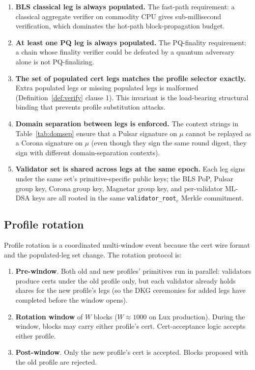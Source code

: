 \begin{enumerate}[leftmargin=2em,nosep]
\item \textbf{BLS classical leg is always populated.} The fast-path
      requirement: a classical aggregate verifier on commodity CPU
      gives sub-millisecond verification, which dominates the
      hot-path block-propagation budget.
\item \textbf{At least one PQ leg is always populated.} The PQ-finality
      requirement: a chain whose finality verifier could be defeated
      by a quantum adversary alone is not PQ-finalizing.
\item \textbf{The set of populated cert legs matches the profile
      selector exactly.} Extra populated legs or missing populated
      legs is malformed (Definition~\ref{def:verify} clause 1).
      This invariant is the load-bearing structural binding that
      prevents profile substitution attacks.
\item \textbf{Domain separation between legs is enforced.} The
      context strings in Table~\ref{tab:domsep} ensure that a Pulsar
      signature on $\mu$ cannot be replayed as a Corona signature on
      $\mu$ (even though they sign the same round digest, they sign
      with different domain-separation contexts).
\item \textbf{Validator set is shared across legs at the same epoch.}
      Each leg signs under the same set's primitive-specific public
      keys; the BLS PoP, Pulsar group key, Corona group key, Magnetar
      group key, and per-validator ML-DSA keys are all rooted in the
      same \texttt{validator\_root}$_e$ Merkle commitment.
\end{enumerate}

\subsection{Profile rotation}
\label{sec:profile-rotation}

Profile rotation is a coordinated multi-window event because the cert
wire format and the populated-leg set change. The rotation protocol is:

\begin{enumerate}[leftmargin=2em,nosep]
\item \textbf{Pre-window}. Both old and new profiles' primitives run in
      parallel: validators produce certs under the old profile only,
      but each validator already holds shares for the new profile's
      legs (so the DKG ceremonies for added legs have completed before
      the window opens).
\item \textbf{Rotation window} of $W$ blocks ($W \approx 1000$ on Lux
      production). During the window, blocks may carry either profile's
      cert. Cert-acceptance logic accepts either profile.
\item \textbf{Post-window}. Only the new profile's cert is accepted.
      Blocks proposed with the old profile are rejected.
\end{enumerate}

